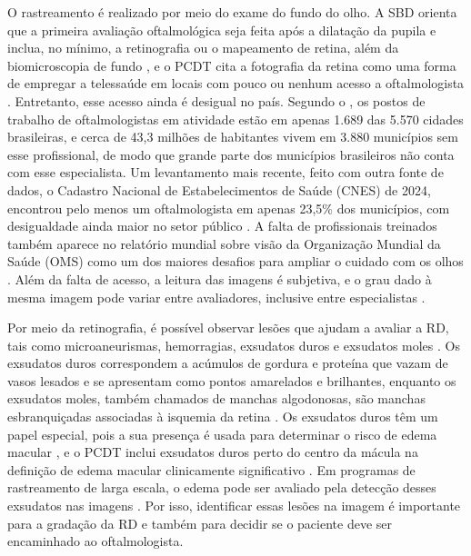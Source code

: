 O rastreamento é realizado por meio do exame do fundo do olho. A SBD orienta que a primeira avaliação oftalmológica seja feita após a dilatação da pupila e inclua, no mínimo, a retinografia ou o mapeamento de retina, além da biomicroscopia de fundo \cite{malerbi2026rd}, e o PCDT cita a fotografia da retina como uma forma de empregar a telessaúde em locais com pouco ou nenhum acesso a oftalmologista \cite{brasil2021pcdtrd}. Entretanto, esse acesso ainda é desigual no país. Segundo o , os postos de trabalho de oftalmologistas em atividade estão em apenas 1.689 das 5.570 cidades brasileiras, e cerca de 43,3 milhões de habitantes vivem em 3.880 municípios sem esse profissional, de modo que grande parte dos municípios brasileiros não conta com esse especialista. Um levantamento mais recente, feito com outra fonte de dados, o Cadastro Nacional de Estabelecimentos de Saúde (CNES) de 2024, encontrou pelo menos um oftalmologista em apenas 23,5\% dos municípios, com desigualdade ainda maior no setor público \cite{gomes2026oftalmologistas}. A falta de profissionais treinados também aparece no relatório mundial sobre visão da Organização Mundial da Saúde (OMS) como um dos maiores desafios para ampliar o cuidado com os olhos \cite[p.~36]{who2019vision}. Além da falta de acesso, a leitura das imagens é subjetiva, e o grau dado à mesma imagem pode variar entre avaliadores, inclusive entre especialistas \cite{krause2018grader}.

Por meio da retinografia, é possível observar lesões que ajudam a avaliar a RD, tais como microaneurismas, hemorragias, exsudatos duros e exsudatos moles \cite{porwal2018idrid}. Os exsudatos duros correspondem a acúmulos de gordura e proteína que vazam de vasos lesados e se apresentam como pontos amarelados e brilhantes, enquanto os exsudatos moles, também chamados de manchas algodonosas, são manchas esbranquiçadas associadas à isquemia da retina \cite{negi2003eye}. Os exsudatos duros têm um papel especial, pois a sua presença é usada para determinar o risco de edema macular \cite{porwal2018idrid}, e o PCDT inclui exsudatos duros perto do centro da mácula na definição de edema macular clinicamente significativo \cite{brasil2021pcdtrd}. Em programas de rastreamento de larga escala, o edema pode ser avaliado pela detecção desses exsudatos nas imagens \cite{giancardo2012exudate}. Por isso, identificar essas lesões na imagem é importante para a gradação da RD e também para decidir se o paciente deve ser encaminhado ao oftalmologista.

